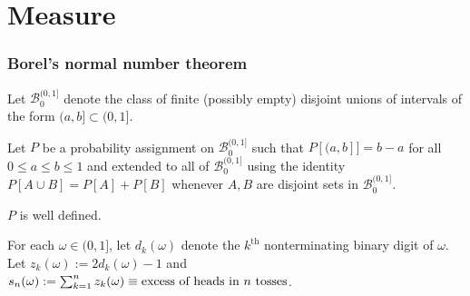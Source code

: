 
\part{Measure}




%
%
\section{Borel's normal number theorem}
\label{Bsec}




\begin{definition}
\label{fb}
Let $\mathcal B_0^{(0,1]}$ denote the class of finite (possibly empty) disjoint unions of intervals of the form  $(a,b]\subset (0,1]$.
\end{definition}

\begin{definition}
\label{l1defP}
Let $P$  be a probability assignment on $\mathcal B_0^{(0,1]}$ such that $P[(a,b]]=b-a$ for all $0\leq a\leq b\leq 1$ and extended to all of $\mathcal B_0^{(0,1]}$ using the identity $P[A\cup B]=P[A]+P[B]$ whenever $A,B$ are disjoint sets in $ \mathcal B_0^{(0,1]}$.
\end{definition}

\begin{theorem}
$P$ is well defined.
\end{theorem}


\begin{definition}
For each $\omega\in(0,1]$, let $d_k(\omega)$ denote the $k^\text{th}$ nonterminating binary digit of $\omega$. Let $z_k(\omega):=2d_k(\omega)-1$ and $s_n(\omega):=\sum_{k=1}^nz_k(\omega)\equiv\text{\rm excess of heads in $n$ tosses}$.
\end{definition}

